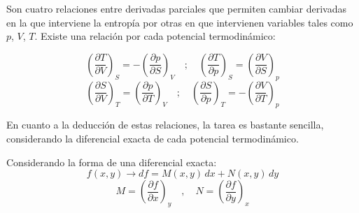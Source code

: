 
Son cuatro relaciones entre derivadas parciales que permiten cambiar derivadas en la que interviene la entropía por otras en que intervienen variables tales como $p$, $V$, $T$.  
Existe una relación por cada potencial termodinámico:

$$
\left(\frac{\partial T}{\partial V}\right)_S=-\left(\frac{\partial p}{\partial S}\right)_V 
\quad ;\quad 
\left(\frac{\partial T}{\partial p}\right)_S=\left(\frac{\partial V}{\partial S}\right)_p 
$$
$$
\left(\frac{\partial S}{\partial V}\right)_T=\left(\frac{\partial p}{\partial T}\right)_V 
\quad ;\quad 
\left(\frac{\partial S}{\partial p}\right)_T=-\left(\frac{\partial V}{\partial T}\right)_p
$$

En cuanto a la deducción de estas relaciones, la tarea es bastante sencilla, considerando la diferencial exacta de cada potencial termodinámico.

Considerando la forma de una diferencial exacta:
\begin{equation}
    f(x,y) \rightarrow df = M(x,y)\,dx + N(x,y)\,dy \tag{1.1}
\end{equation}
\begin{equation}
    M = \left( \frac{\partial f}{\partial x}\right)_y  \quad ,\quad 
    N=\left( \frac{\partial f}{\partial y} \right)_x \tag{1.2}
\end{equation}

